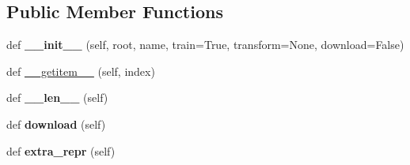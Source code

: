 \subsection*{Public Member Functions}
\begin{DoxyCompactItemize}
\item 
\mbox{\label{classtorchvision_1_1datasets_1_1phototour_1_1PhotoTour_af520cb27f84a2a381acc38784b0eb6d1}} 
def {\bfseries \+\_\+\+\_\+init\+\_\+\+\_\+} (self, root, name, train=True, transform=None, download=False)
\item 
def \hyperlink{classtorchvision_1_1datasets_1_1phototour_1_1PhotoTour_ae119a9f9f84400c0a10039457023311b}{\+\_\+\+\_\+getitem\+\_\+\+\_\+} (self, index)
\item 
\mbox{\label{classtorchvision_1_1datasets_1_1phototour_1_1PhotoTour_a511ec1dc805307a29fd1b9fece2339ab}} 
def {\bfseries \+\_\+\+\_\+len\+\_\+\+\_\+} (self)
\item 
\mbox{\label{classtorchvision_1_1datasets_1_1phototour_1_1PhotoTour_aa8de135f529f99ed316ce522538f46c8}} 
def {\bfseries download} (self)
\item 
\mbox{\label{classtorchvision_1_1datasets_1_1phototour_1_1PhotoTour_a886717e2d08d3fcb05fc202f20f16043}} 
def {\bfseries extra\+\_\+repr} (self)
\end{DoxyCompactItemize}
